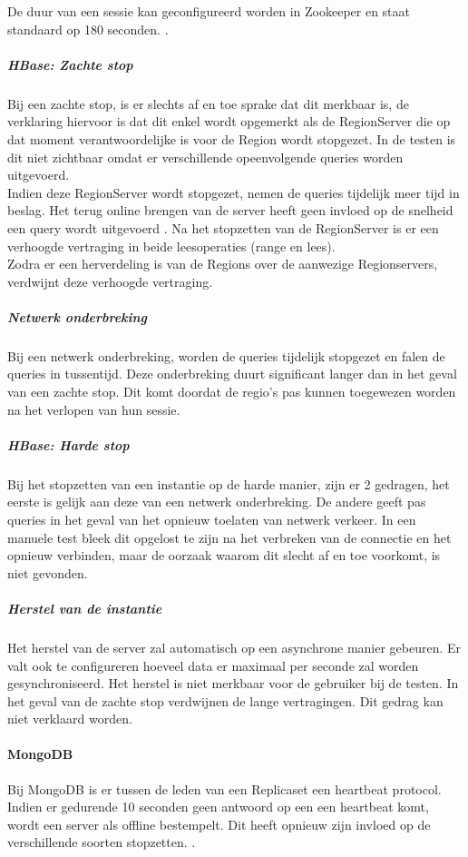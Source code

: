 De duur van een sessie kan geconfigureerd worden in Zookeeper en staat standaard op 180 seconden. \cite{hbase-doc}. 

\subparagraph{HBase: Zachte stop} Bij een zachte stop, is er slechts af en toe sprake dat dit merkbaar is, de verklaring hiervoor is dat dit enkel wordt opgemerkt als de RegionServer die op dat moment verantwoordelijke is voor de Region wordt stopgezet. In de testen is dit niet zichtbaar omdat er verschillende opeenvolgende queries worden uitgevoerd. \\
Indien deze RegionServer wordt stopgezet, nemen de queries tijdelijk meer tijd in beslag.  Het terug online brengen van de server heeft geen invloed op de snelheid een query wordt uitgevoerd . Na het stopzetten van de RegionServer is er een verhoogde vertraging in beide leesoperaties (range en lees). \\
Zodra er een herverdeling is van de Regions over de aanwezige Regionservers, verdwijnt deze verhoogde vertraging. 

\subparagraph{Netwerk onderbreking} Bij een netwerk onderbreking, worden de queries tijdelijk stopgezet en falen de queries in tussentijd. Deze onderbreking duurt significant langer dan in het geval van een zachte stop. Dit komt doordat de regio's pas kunnen toegewezen worden na het verlopen van hun sessie.  

\subparagraph{HBase: Harde stop} Bij het stopzetten van een instantie op de harde manier, zijn er 2 gedragen, het eerste is gelijk aan deze van een netwerk onderbreking. De andere geeft pas queries in het geval van het opnieuw toelaten van netwerk verkeer. In een manuele test bleek dit opgelost te zijn na het verbreken van de connectie en het opnieuw verbinden, maar de oorzaak waarom dit slecht af en toe voorkomt, is niet gevonden. 

\subparagraph{Herstel van de instantie} Het herstel van de server zal automatisch op een asynchrone manier gebeuren. Er valt ook te configureren hoeveel data er maximaal per seconde zal worden gesynchroniseerd. Het herstel is niet merkbaar voor de gebruiker bij de testen. In het geval van de zachte stop verdwijnen de lange vertragingen. Dit gedrag kan niet verklaard worden. 

\paragraph{MongoDB} Bij MongoDB is er tussen de leden van een Replicaset een heartbeat protocol. Indien er gedurende 10 seconden geen antwoord op een een heartbeat komt, wordt een server als offline bestempelt. Dit heeft opnieuw zijn invloed op de verschillende soorten stopzetten. \cite{mongodb-manual}. 

